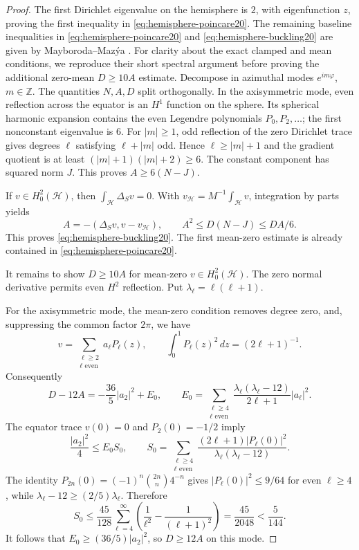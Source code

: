 \documentclass[11pt,a4paper]{article}
\theoremstyle{remark}
\numberwithin{equation}{section}
\begin{document}
\begin{proof}
The first Dirichlet eigenvalue on the hemisphere is $2$, with eigenfunction
$z$, proving the first inequality in \eqref{eq:hemisphere-poincare20}.
The remaining baseline inequalities in \eqref{eq:hemisphere-poincare20}
and \eqref{eq:hemisphere-buckling20} are given by
Mayboroda--Maz\'ya \cite[Lemma~2.3, especially (2.16) and (2.25)]{MayborodaMazya2008}.
For clarity about the exact clamped and mean conditions, we reproduce
their short spectral argument before proving the additional zero-mean
$D\ge10A$ estimate.
Decompose in azimuthal modes $e^{im\varphi}$, $m\in\mathbb Z$. The quantities
$N,A,D$ split orthogonally. In the axisymmetric mode, even reflection across
the equator is an $H^1$ function on the sphere. Its spherical harmonic
expansion contains the even Legendre polynomials $P_0,P_2,\ldots$; the first
nonconstant eigenvalue is $6$. For $|m|\ge1$, odd reflection of the zero
Dirichlet trace gives degrees $\ell$ satisfying $\ell+|m|$ odd. Hence
$\ell\ge|m|+1$ and the gradient quotient is at least
$(|m|+1)(|m|+2)\ge6$. The constant component has squared norm $J$.
This proves $A\ge6(N-J)$.

If $v\in H_0^2(\mathcal H)$, then $\int_{\mathcal H}\Delta_Sv=0$.
With $v_{\mathcal H}=M^{-1}\int_{\mathcal H}v$, integration by parts yields
\[
 A=-(\Delta_Sv,v-v_{\mathcal H}),\qquad
 A^2\le D(N-J)\le DA/6.
\]
This proves \eqref{eq:hemisphere-buckling20}. The first mean-zero estimate
is already contained in \eqref{eq:hemisphere-poincare20}.

It remains to show $D\ge10A$ for mean-zero $v\in H_0^2(\mathcal H)$.
The zero normal derivative permits even $H^2$ reflection. Put
$\lambda_\ell=\ell(\ell+1)$.

For the axisymmetric mode, the mean-zero condition removes degree zero,
and, suppressing the common factor $2\pi$, we have
\[
 v=\sum_{\substack{\ell\ge2\\\ell\text{ even}}}a_\ell P_\ell(z),
 \qquad \int_0^1P_\ell(z)^2\,dz=(2\ell+1)^{-1}.
\]
Consequently
\[
 D-12A=-\frac{36}{5}|a_2|^2+E_0,
 \qquad
 E_0=\sum_{\substack{\ell\ge4\\\ell\text{ even}}}
 \frac{\lambda_\ell(\lambda_\ell-12)}{2\ell+1}|a_\ell|^2.
\]
The equator trace $v(0)=0$ and $P_2(0)=-1/2$ imply
\[
 \frac{|a_2|^2}{4}\le E_0S_0,
 \qquad
 S_0=\sum_{\substack{\ell\ge4\\\ell\text{ even}}}
 \frac{(2\ell+1)|P_\ell(0)|^2}{\lambda_\ell(\lambda_\ell-12)}.
\]
The identity $P_{2n}(0)=(-1)^n\binom{2n}{n}4^{-n}$ gives
$|P_\ell(0)|^2\le9/64$ for even $\ell\ge4$, while
$\lambda_\ell-12\ge(2/5)\lambda_\ell$. Therefore
\[
 S_0\le\frac{45}{128}\sum_{\ell=4}^\infty
 \left(\frac1{\ell^2}-\frac1{(\ell+1)^2}\right)
 =\frac{45}{2048}<\frac5{144}.
\]
It follows that $E_0\ge(36/5)|a_2|^2$, so $D\ge12A$ on this mode.


\end{proof}
\end{document}
